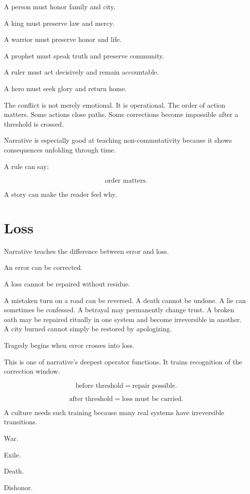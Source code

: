\documentclass[11pt]{book}
\begin{document}
A person must honor family and city.

A king must preserve law and mercy.

A warrior must preserve honor and life.

A prophet must speak truth and preserve community.

A ruler must act decisively and remain accountable.

A hero must seek glory and return home.

The conflict is not merely emotional. It is operational. The order of action matters. Some actions close paths. Some corrections become impossible after a threshold is crossed.

Narrative is especially good at teaching non-commutativity because it shows consequences unfolding through time.

A rule can say:

\[
\text{order matters}.
\]

A story can make the reader feel why.

\section{Loss}

Narrative teaches the difference between error and loss.

An error can be corrected.

A loss cannot be repaired without residue.

A mistaken turn on a road can be reversed. A death cannot be undone. A lie can sometimes be confessed. A betrayal may permanently change trust. A broken oath may be repaired ritually in one system and become irreversible in another. A city burned cannot simply be restored by apologizing.

Tragedy begins when error crosses into loss.

This is one of narrative's deepest operator functions. It trains recognition of the correction window.

\[
\text{before threshold} = \text{repair possible}.
\]

\[
\text{after threshold} = \text{loss must be carried}.
\]

A culture needs such training because many real systems have irreversible transitions.

War.

Exile.

Death.

Dishonor.
\end{document}
